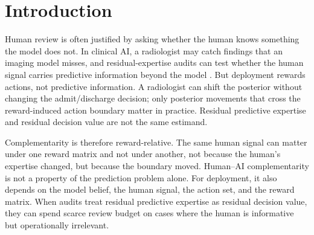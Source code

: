 \section{Introduction}
\label{sec:intro}

Human review is often justified by asking whether the human knows something the model does not.
In clinical AI, a radiologist may catch findings that an imaging model misses, and residual-expertise audits can test whether the human signal carries predictive information beyond the model \citep{AlurEtAl2023,AlurRaghavanShah2024}.
But deployment rewards actions, not predictive information.
A radiologist can shift the posterior without changing the admit/discharge decision; only posterior movements that cross the reward-induced action boundary matter in practice.
Residual predictive expertise and residual decision value are not the same estimand.

Complementarity is therefore reward-relative.
The same human signal can matter under one reward matrix and not under another, not because the human's expertise changed, but because the boundary moved.
Human--AI complementarity is not a property of the prediction problem alone.
For deployment, it also depends on the model belief, the human signal, the action set, and the reward matrix.
When audits treat residual predictive expertise as residual decision value, they can spend scarce review budget on cases where the human is informative but operationally irrelevant.

